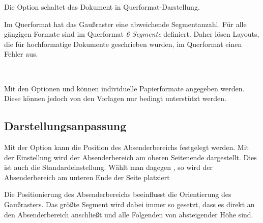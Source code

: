 \begin{Declaration}
\end{Declaration}

\begin{minipage}{0.45\textwidth}
Die Option  schaltet das Dokument in Querformat-Darstellung.

\begin{important}
  Im Querformat hat das Gaußraster eine abweichende
  Segmentanzahl. Für alle gängigen Formate sind im Querformat \emph{6 Segmente}
  definiert. Daher lösen Layouts, die für hochformatige Dokumente
  geschrieben wurden, im Querformat einen Fehler aus. %
\end{important}
\end{minipage}\hfill
\begin{minipage}{0.5\textwidth}\centering
{}
\end{minipage}

\begin{Declaration}
  \\
\end{Declaration}

Mit den Optionen  und  können individuelle
Papierformate angegeben werden.
Diese können jedoch von den Vorlagen nur bedingt unterstützt werden.


\subsection{Darstellungsanpassung}

\vspace*{-6mm}
\begin{Declaration}
\end{Declaration}

Mit der Option  kann die Position des Absenderbereichs
festgelegt werden. Mit der Einstellung  wird
der Absenderbereich am oberen Seitenende dargestellt. Dies ist auch die
Standardeinstellung. Wählt man dagegen , so
wird der Absenderbereich am unteren Ende der Seite platziert

\begin{important}
  Die Positionierung des Absenderbereichs beeinflusst die Orientierung des
  Gaußrasters. Das größte Segment wird dabei immer so gesetzt, dass es direkt
  an den Absenderbereich anschließt und alle Folgenden von absteigender Höhe sind.
\end{important}


